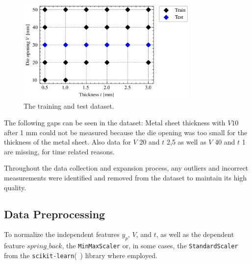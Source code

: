\begin{figure}[h]
    \begin{tcolorbox}[arc=0pt,boxrule=0.5pt]
        \centering
        \includegraphics[width=0.8\textwidth]{chap4/images/test_train_split}
    \end{tcolorbox}
    \caption{The training and test dataset.}
    \label{fig:train_test_split}
\end{figure}

The following gaps can be seen in the dataset: Metal sheet thickness with $V10$  after 1 mm could not be measured
because the die opening was too small for the thickness of the metal sheet.
Also data for $V$ 20 and $t$ 2,5 as well as $V$ 40 and $t$ 1 are missing, for time related reasons.

Throughout the data collection and expansion process, any outliers and incorrect measurements were identified and
removed from the dataset to maintain its high quality.


\subsection{Data Preprocessing}\label{subsec:data-preprocessing}
To normalize the independent features $y_p$, $V$, and $t$, as well as the dependent feature $spring\_back$, the
\texttt{MinMaxScaler} or, in some cases, the \texttt{StandardScaler} from the
\texttt{scikit-learn}(~\cite{scikit-learn}) library where employed.

